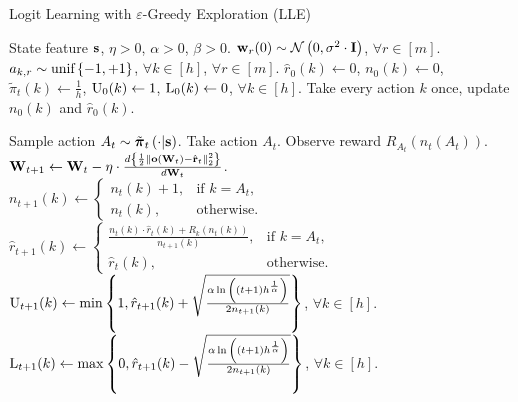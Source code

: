 \begin{algorithm}[t]
	\caption{Logit Learning with $\varepsilon$-Greedy Exploration (LLE)}
	\label{alg:logit_learning_eps_greedy_exploration}
	\begin{algorithmic}
		 State feature ${\mathbf{s}}$, $\eta > 0$, $\alpha > 0$, $\beta > 0$.
		\STATE ${\mathbf{w}}_r(0) \sim {\mathcal{N}}\left( 0, \sigma^2 \cdot {\mathbf{I}} \right)$, $\forall r \in [m]$. $a_{k, r} \sim {\text{unif}}\left\{-1, +1\right\}$, $\forall k \in [h]$, $\forall r \in [m]$.
		\STATE $\hat{r}_{0}(k) \gets 0$, $n_{0}(k) \gets 0$, $\tilde{\pi}_t(k) \gets \frac{1}{h}$, ${\text{U}}_{0}(k) \gets 1$, ${\text{L}}_{0}(k) \gets 0$, $\forall k \in [h]$.
		\STATE Take every action $k$ once, update $n_{0}(k)$ and $\hat{r}_{0}(k)$.
		
		\STATE Sample action $A_{t} \sim \tilde{{\boldsymbol{\pi}}}_t\left(\cdot \middle| {\mathbf{s}} \right)$. Take action $A_{t}$. Observe reward $R_{ A_{t}}\left(n_{t}\left(A_t\right) \right)$.
		\STATE ${\mathbf{W}}_{t+1} \leftarrow {\mathbf{W}}_t - \eta \cdot \frac{d \left\{ \frac{1}{2} \left\| {\mathbf{o}}\left( {\mathbf{W}}_t\right) - \hat{{\mathbf{r}}}_t \right\|_2^2 \right\}}{d {\mathbf{W}}_t}$.
		\STATE $n_{t+1}(k) \gets \left. 
		    \begin{cases}
		    n_{t}(k) + 1, & \text{if } k = A_t, \\
		    n_{t}(k), & \text{otherwise}.
		    \end{cases}
		    \right. \qquad$
		$\hat{r}_{t+1}(k) \gets \left. 
		    \begin{cases}
		    \frac{n_{t}(k) \cdot \hat{r}_{t}(k) + R_{k}\left(n_{t}(k)\right) }{n_{t+1}(k)}, & \text{if } k = A_t, \\
		    \hat{r}_{t}(k), & \text{otherwise}.
		    \end{cases}
		    \right.$
		\STATE ${\text{U}}_{t+1}(k) \gets
		    \min{\left\{ 1, \hat{r}_{t+1}(k) + \sqrt{\frac{\alpha \ln{\left( (t+1) h^{\frac{1}{\alpha}}\right)}}{2 n_{t+1}(k)}}\right\}}$, $\forall k \in [h]$.
		\STATE ${\text{L}}_{t+1}(k) \gets 
		    \max{\left\{ 0, \hat{r}_{t+1}(k) - \sqrt{\frac{\alpha \ln{\left( (t+1) h^{\frac{1}{\alpha}}\right)}}{2 n_{t+1}(k)}}\right\}}$, $\forall k \in [h]$.
		

\end{algorithmic}
\end{algorithm}
